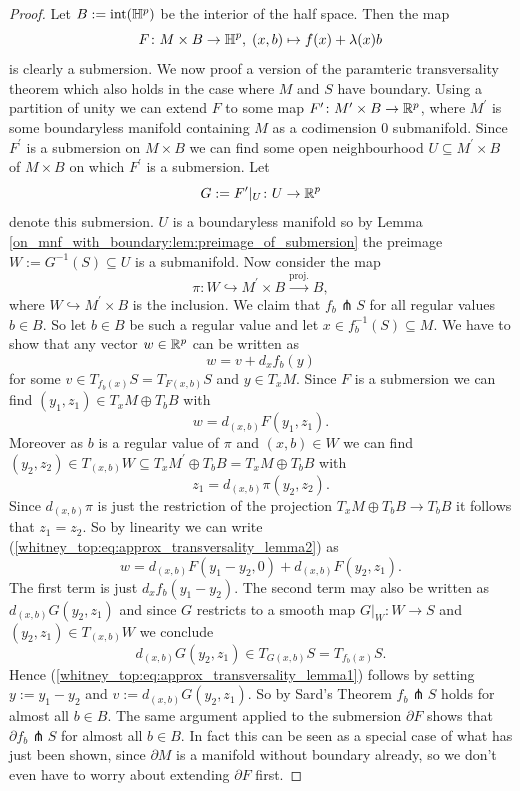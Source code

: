 \begin{proof}
    Let $B := \mathrm{int}(\mathbb{H}^p)$ be the interior of the half space. Then the map 
    \[
    F \colon M \times B \to \mathbb{H}^p, \; (x,b) \mapsto f(x) + \lambda(x)b
    \]
    is clearly a submersion. We now proof a version of the paramteric transversality theorem which also holds in the case where $M$ and $S$ have boundary. Using a partition of unity we can extend $F$ to some map $F^\prime \colon M^\prime \times B \to \mathbb{R}^p$, where $M^\prime$ is some boundaryless manifold containing $M$ as a codimension $0$ submanifold. Since $F^\prime$ is a submersion on $M \times B$ we can find some open neighbourhood $U \subseteq M^\prime \times B$ of $M \times B$ on which $F^\prime$ is a submersion. Let 
    \[
    G := F^\prime|_U \colon U \to \mathbb{R}^p
    \]
    denote this submersion. $U$ is a boundaryless manifold so by Lemma \ref{on_mnf_with_boundary:lem:preimage_of_submersion} the preimage $W:= G^{-1}(S) \subseteq U$ is a submanifold. Now consider the map 
    \[
    \pi \colon W \hookrightarrow M^\prime \times B \xrightarrow{\text{proj.}} B,
    \]
    where $W \hookrightarrow M^\prime \times B$ is the inclusion. We claim that $f_b \pitchfork S$ for all regular values $b \in B$. So let $b \in B$ be such a regular value and let $x \in f_b^{-1}(S)\subseteq M$. We have to show that any vector $w \in \mathbb{R}^p$ can be written as 
    \begin{equation}
        \label{whitney_top:eq:approx_transversality_lemma1}
    w = v + d_xf_b(y)
    \end{equation}
    for some $v \in T_{f_b(x)} S = T_{F(x,b)} S$ and $y \in T_xM$. Since $F$ is a submersion we can find $(y_1,z_1) \in T_x M \oplus T_b B$ with 
    \begin{equation}
        \label{whitney_top:eq:approx_transversality_lemma2}
    w = d_{(x,b)}F(y_1,z_1).
    \end{equation}
    Moreover as $b$ is a regular value of $\pi$ and $(x,b) \in W$ we can find $(y_2,z_2) \in T_{(x,b)}W \subseteq T_x M^\prime \oplus T_b B = T_x M \oplus T_b B$ with 
    \[
    z_1 = d_{(x,b)} \pi (y_2,z_2).
    \]
    Since $d_{(x,b)} \pi$ is just the restriction of the projection $T_xM \oplus T_b B \to T_b B$ it follows that $z_1 = z_2$. So by linearity we can write (\ref{whitney_top:eq:approx_transversality_lemma2}) as
    \[
    w = d_{(x,b)}F(y_1-y_2,0) + d_{(x,b)}F(y_2,z_1).
    \]
    The first term is just $d_xf_b(y_1-y_2)$. The second term may also be written as  $d_{(x,b)}G(y_2,z_1)$ and since $G$ restricts to a smooth map $G|_W \colon W \to S$ and $(y_2,z_1) \in T_{(x,b)}W$ we conclude $$d_{(x,b)}G(y_2,z_1) \in T_{G(x,b)} S = T_{f_b(x)}S.$$ Hence (\ref{whitney_top:eq:approx_transversality_lemma1}) follows by setting $y:= y_1-y_2$ and $v := d_{(x,b)}G(y_2,z_1)$. So by Sard's Theorem $f_b \pitchfork S$ holds for almost all $b \in B$. The same argument applied to the submersion $\partial F$ shows that $\partial f_b \pitchfork S$ for almost all $b \in B$. In fact this can be seen as a special case of what has just been shown, since $\partial M$ is a manifold without boundary already, so we don't even have to worry about extending $\partial F$ first.
\end{proof}

